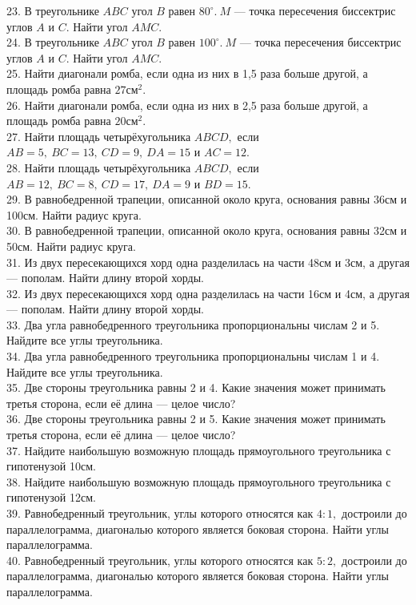 \documentclass[12pt]{article}
\begin{document}
23. В треугольнике $ABC$ угол $B$ равен $80^\circ.\ M$ --- точка пересечения биссектрис углов $A$ и $C.$ Найти угол $AMC.$\\
24. В треугольнике $ABC$ угол $B$ равен $100^\circ.\ M$ --- точка пересечения биссектрис углов $A$ и $C.$ Найти угол $AMC.$\\
25. Найти диагонали ромба, если одна из них в 1,5 раза больше другой, а площадь ромба равна $27\text{см}^2.$\\
26. Найти диагонали ромба, если одна из них в 2,5 раза больше другой, а площадь ромба равна $20\text{см}^2.$\\
27. Найти площадь четырёхугольника $ABCD,$ если $AB=5,\ BC=13,\ CD=9,\ DA=15$ и $AC=12.$\\
28. Найти площадь четырёхугольника $ABCD,$ если $AB=12,\ BC=8,\ CD=17,\ DA=9$ и $BD=15.$\\
29. В равнобедренной трапеции, описанной  около круга, основания равны 36см и 100см. Найти радиус круга.\\
30. В равнобедренной трапеции, описанной  около круга, основания равны 32см и 50см. Найти радиус круга.\\
31. Из двух пересекающихся хорд одна разделилась на части 48см и 3см, а другая --- пополам. Найти длину второй хорды.\\
32. Из двух пересекающихся хорд одна разделилась на части 16см и 4см, а другая --- пополам. Найти длину второй хорды.\\
33. Два угла равнобедренного треугольника пропорциональны числам 2 и 5. Найдите все углы треугольника.\\
34. Два угла равнобедренного треугольника пропорциональны числам 1 и 4. Найдите все углы треугольника.\\
35. Две стороны треугольника равны 2 и 4. Какие значения может принимать третья сторона, если её длина --- целое число?\\
36. Две стороны треугольника равны 2 и 5. Какие значения может принимать третья сторона, если её длина --- целое число?\\
37. Найдите наибольшую возможную площадь прямоугольного треугольника с гипотенузой 10см.\\
38. Найдите наибольшую возможную площадь прямоугольного треугольника с гипотенузой 12см.\\
39. Равнобедренный треугольник, углы которого относятся как $4:1,$ достроили до параллелограмма, диагональю которого является боковая сторона. Найти углы параллелограмма.\\
40. Равнобедренный треугольник, углы которого относятся как $5:2,$ достроили до параллелограмма, диагональю которого является боковая сторона. Найти углы параллелограмма.\\
\end{document}
